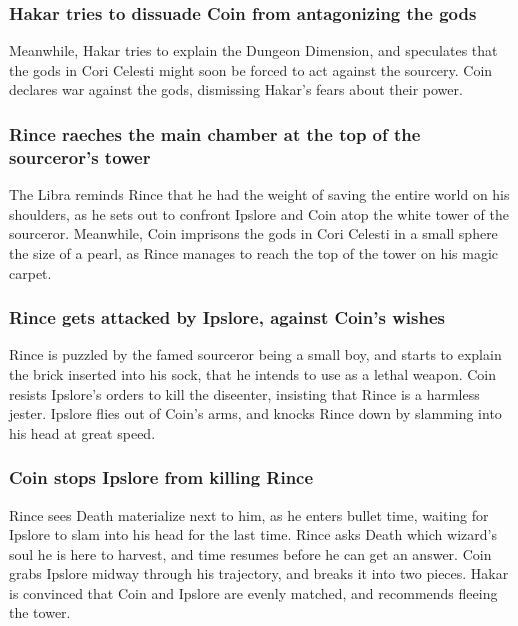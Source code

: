\subsubsection{\Gls{Hakar} tries to dissuade \Gls{Coin} from  antagonizing the gods}
Meanwhile, \Gls{Hakar} tries to explain the Dungeon Dimension, and speculates that the gods in Cori
Celesti might soon be forced to act against the sourcery. \Gls{Coin} declares war against the gods,
dismissing \Gls{Hakar}'s fears about their power.

\subsubsection{\Gls{Rince} raeches the main chamber at the top of the sourceror's tower}
The \Gls{Libra} reminds \Gls{Rince} that he had the weight of saving the entire world on his
shoulders, as he sets out to confront \Gls{Ipslore} and \Gls{Coin} atop the white tower of the
sourceror. Meanwhile, \Gls{Coin} imprisons the gods in Cori Celesti in a small sphere the size of
a pearl, as \Gls{Rince} manages to reach the top of the tower on his magic carpet.

\subsubsection{\Gls{Rince} gets attacked by \Gls{Ipslore}, against \Gls{Coin}'s wishes}
\Gls{Rince} is puzzled by the famed sourceror being a small boy, and starts to explain the brick
inserted into his sock, that he intends to use as a lethal weapon. \Gls{Coin} resists
\Gls{Ipslore}'s orders to kill the diseenter, insisting that \Gls{Rince} is a harmless jester.
\Gls{Ipslore} flies out of \Gls{Coin}'s arms, and knocks \Gls{Rince} down by slamming into his head
at great speed.

\subsubsection{\Gls{Coin} stops \Gls{Ipslore} from killing \Gls{Rince}}
\Gls{Rince} sees \Gls{Death} materialize next to him, as he enters bullet time, waiting for
\Gls{Ipslore} to slam into his head for the last time. \Gls{Rince} asks \Gls{Death} which wizard's
soul he is here to harvest, and time resumes before he can get an answer. \Gls{Coin} grabs
\Gls{Ipslore} midway through his trajectory, and breaks it into two pieces. \Gls{Hakar} is convinced
that \Gls{Coin} and \Gls{Ipslore} are evenly matched, and recommends fleeing the tower.


